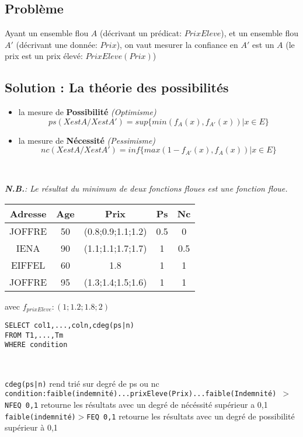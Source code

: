 \documentclass[a4paper,11pt]{article}
\begin{document}
\subsection{Problème}

Ayant un ensemble flou $ A $ (décrivant un prédicat: $PrixEleve$), et un ensemble flou $ A' $   (décrivant une donnée: $Prix$), on vaut mesurer la confiance en  $ A' $ est un $ A $ (le prix est un prix élevé: $PrixEleve(Prix)$)

\subsection{Solution : La théorie des possibilités}
\begin{itemize}
\item la mesure de \textbf{Possibilité} \emph{(Optimisme)}\\
$$ ps(X est A / Xest A')=sup\{min(f_A(x),f_{A'}(x)) | x \in E\} $$
\item la mesure de \textbf{Nécessité} \emph{(Pessimisme)}\\
$$ nc(X est A / X est A')=inf \{max(1-f_{A'}(x), f_A(x)) | x \in E\} $$
\end{itemize}
~

\emph{\textbf{N.B.}: Le résultat du minimum de deux fonctions floues est une fonction floue.}

\begin{center}
\begin{tabular}{|c|c|c|c|c|}
	\hline 
	\textbf{Adresse} & \textbf{Age} & \textbf{Prix} & \textbf{Ps} & \textbf{Nc} \\ 
	\hline
	\hline 
	JOFFRE & 50 & (0.8;0.9;1.1;1.2) & 0.5 & 0 \\ 
	\hline 
	IENA & 90 & (1.1;1.1;1.7;1.7) & 1 & 0.5  \\ 
	\hline 
	EIFFEL & 60 & 1.8 & 1 & 1  \\ 
	\hline 
	JOFFRE & 95 & (1.3;1.4;1.5;1.6) & 1 & 1  \\ 
	\hline 
\end{tabular} 
\end{center}
avec $f_{prixEleve}:(1;1.2;1.8;2)$

\begin{lstlisting}[mathescape]
SELECT col1,...,coln,cdeg(ps|n)
FROM T1,...,Tm
WHERE condition
\end{lstlisting}
~

\noindent \texttt{cdeg(ps|n)} rend trié sur degré de ps ou nc\\
\texttt{condition:faible(indemnité)...prixEleve(Prix)...faible(Indemnité) $>$ NFEQ 0,1} retourne les résultats avec un degré de nécéssité supérieur a 0,1\\
\texttt{faible(indemnité)$>$FEQ 0,1} retourne les résultats avec un degré de possibilité supérieur à 0,1
\end{document}
